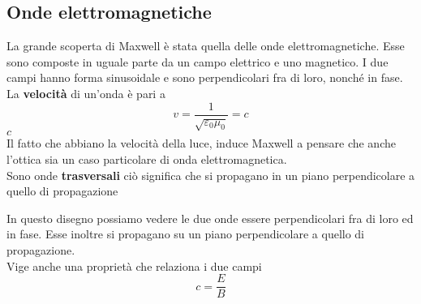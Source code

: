 \subsection{Onde elettromagnetiche}
La grande scoperta di Maxwell è stata quella delle onde elettromagnetiche. Esse sono composte in 
uguale parte da un campo elettrico e uno magnetico. I due campi hanno forma sinusoidale e sono
perpendicolari fra di loro, nonché in fase.\\
La \textbf{velocità} di un'onda è pari a
\begin{equation*}
  v = \frac{1}{\sqrt{\varepsilon_0\mu_0} }=c
\end{equation*}
\hyperref[tab:c]{$c$}\\
Il fatto che abbiano la velocità della luce, induce Maxwell a pensare che anche l'ottica sia un caso
particolare di onda elettromagnetica.\\
Sono onde \textbf{trasversali} ciò significa che si propagano in un piano perpendicolare a quello di
propagazione
\begin{center}
\end{center}
In questo disegno possiamo vedere le due onde essere perpendicolari fra di loro ed in fase. Esse
inoltre si propagano su un piano perpendicolare a quello di propagazione.\\
Vige anche una proprietà che relaziona i due campi
\begin{equation*}
  c = \frac{E}{B}
\end{equation*}

